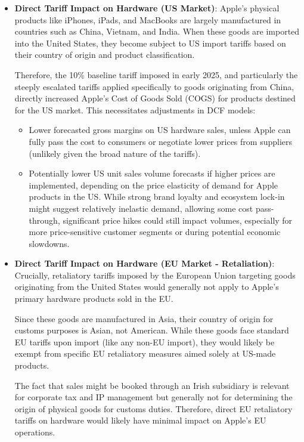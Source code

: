 \begin{itemize}
    \item \textbf{Direct Tariff Impact on Hardware (US Market)}:
          Apple's physical products like iPhones, iPads, and MacBooks are largely manufactured in countries such as China, Vietnam, and India. When these goods are imported into the United States, they become subject to US import tariffs based on their country of origin and product classification.

          Therefore, the 10\% baseline tariff imposed in early 2025, and particularly the steeply escalated tariffs applied specifically to goods originating from China, directly increased Apple's Cost of Goods Sold (COGS) for products destined for the US market. This necessitates adjustments in DCF models:
          \begin{itemize}
              \item Lower forecasted gross margins on US hardware sales, unless Apple can fully pass the cost to consumers or negotiate lower prices from suppliers (unlikely given the broad nature of the tariffs).
              \item Potentially lower US unit sales volume forecasts if higher prices are implemented, depending on the price elasticity of demand for Apple products in the US. While strong brand loyalty and ecosystem lock-in might suggest relatively inelastic demand, allowing some cost pass-through, significant price hikes could still impact volumes, especially for more price-sensitive customer segments or during potential economic slowdowns.
          \end{itemize}

    \item \textbf{Direct Tariff Impact on Hardware (EU Market - Retaliation)}:
          Crucially, retaliatory tariffs imposed by the European Union targeting goods originating from the United States would generally not apply to Apple's primary hardware products sold in the EU.

          Since these goods are manufactured in Asia, their country of origin for customs purposes is Asian, not American. While these goods face standard EU tariffs upon import (like any non-EU import), they would likely be exempt from specific EU retaliatory measures aimed solely at US-made products.

          The fact that sales might be booked through an Irish subsidiary is relevant for corporate tax and IP management but generally not for determining the origin of physical goods for customs duties. Therefore, direct EU retaliatory tariffs on hardware would likely have minimal impact on Apple's EU operations.


\end{itemize}
